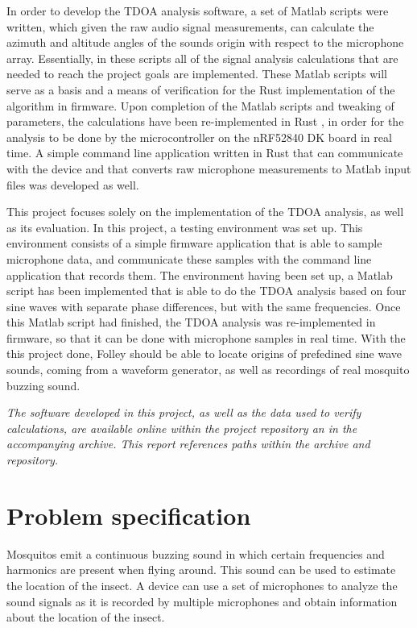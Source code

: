 \documentclass[a4paper]{article}
\begin{document}
In order to develop the TDOA analysis software, a set of Matlab \cite{matlab} scripts were written, which given the raw audio signal measurements, can calculate the azimuth and altitude angles of the sounds origin with respect to the microphone array. Essentially, in these scripts all of the signal analysis calculations that are needed to reach the project goals are implemented. These Matlab scripts will serve as a basis and a means of verification for the Rust implementation of the algorithm in firmware. Upon completion of the Matlab scripts and tweaking of parameters, the calculations have been re-implemented in Rust \cite{rust}, in order for the analysis to be done by the microcontroller on the nRF52840 DK \cite{nrf52840-dk} board in real time. A simple command line application written in Rust that can communicate with the device and that converts raw microphone measurements to Matlab input files was developed as well.

This project focuses solely on the implementation of the TDOA analysis, as well as its evaluation. In this project, a testing environment was set up. This environment consists of a simple firmware application that is able to sample microphone data, and communicate these samples with the command line application that records them. The environment having been set up, a Matlab script has been implemented that is able to do the TDOA analysis based on four sine waves with separate phase differences, but with the same frequencies. Once this Matlab script had finished, the TDOA analysis was re-implemented in firmware, so that it can be done with microphone samples in real time. With the this project done, Folley should be able to locate origins of prefedined sine wave sounds, coming from a waveform generator, as well as recordings of real mosquito buzzing sound.

\textit{The software developed in this project, as well as the data used to verify calculations, are available online within the project repository \cite{repo} an in the accompanying archive. This report references paths within the archive and repository.}

\section{Problem specification}
Mosquitos emit a continuous buzzing sound in which certain frequencies and harmonics are present when flying around. This sound can be used to estimate the location of the insect. A device can use a set of microphones to analyze the sound signals as it is recorded by multiple microphones and obtain information about the location of the insect.
\end{document}
